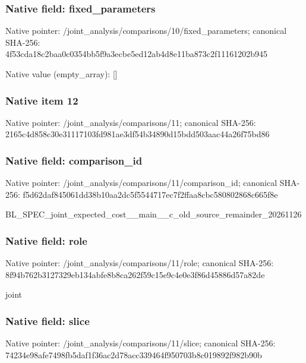 \documentclass[10pt,a4paper]{article}
\begin{document}
\subsubsection{Native field: fixed\_parameters}


Native pointer: /joint\_analysis/comparis\allowbreak{}ons/10/fixed\_parameters; canonical SHA-256: 4f53cda18c2baa0c0354bb5f\allowbreak{}9a3ecbe5ed12ab4d8e11ba87\allowbreak{}3c2f11161202b945



Native value (empty\_array): []



\subsubsection{Native item 12}


Native pointer: /joint\_analysis/comparisons/11; canonical SHA-256: 2165c4d858c30e31117103fd\allowbreak{}981ae3df54b34890d15bdd50\allowbreak{}3aac44a26f75bd86



\subsubsection{Native field: comparison\_id}


Native pointer: /joint\_analysis/comparis\allowbreak{}ons/11/comparison\_id; canonical SHA-256: f5d62daf845061dd38b10aa2\allowbreak{}dc5f5544717ec7f2ffaa8cbc\allowbreak{}580802868c665f8e


BL\_SPEC\_joint\_expected\_c\allowbreak{}ost\_\_main\_\_c\_old\_source\_\allowbreak{}remainder\_20261126


\subsubsection{Native field: role}


Native pointer: /joint\_analysis/comparisons/11/role; canonical SHA-256: 8f94b762b3127329eb134abf\allowbreak{}e8b8ca262f59c15e9c4e0e3f\allowbreak{}86d45886d57a82de


joint


\subsubsection{Native field: slice}


Native pointer: /joint\_analysis/comparisons/11/slice; canonical SHA-256: 74234e98afe7498fb5daf1f3\allowbreak{}6ac2d78acc339464f950703b\allowbreak{}8c019892f982b90b
\end{document}
